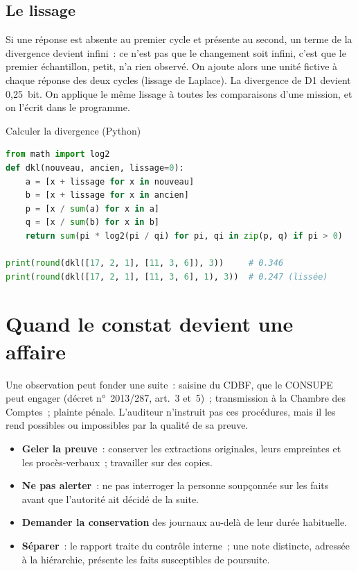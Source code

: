 \subsection{Le lissage}

Si une réponse est absente au premier cycle et présente au second, un terme
de la divergence devient infini~: ce n'est pas que le changement soit
infini, c'est que le premier échantillon, petit, n'a rien observé. On
ajoute alors une unité fictive à chaque réponse des deux cycles (lissage de
Laplace). La divergence de D1 devient 0,25~bit. On applique le même lissage
à toutes les comparaisons d'une mission, et on l'écrit dans le programme.

\begin{boxoutils}{Calculer la divergence (Python)}
\begin{lstlisting}[language=Python]
from math import log2
def dkl(nouveau, ancien, lissage=0):
    a = [x + lissage for x in nouveau]
    b = [x + lissage for x in ancien]
    p = [x / sum(a) for x in a]
    q = [x / sum(b) for x in b]
    return sum(pi * log2(pi / qi) for pi, qi in zip(p, q) if pi > 0)

print(round(dkl([17, 2, 1], [11, 3, 6]), 3))     # 0.346
print(round(dkl([17, 2, 1], [11, 3, 6], 1), 3))  # 0.247 (lissée)
\end{lstlisting}
\end{boxoutils}

\separateur

\section{Quand le constat devient une affaire}
\label{sec:c08-suites}

Une observation peut fonder une suite~: saisine du CDBF, que le CONSUPE peut
engager (décret n°~2013/287, art.~3 et~5)~; transmission à la Chambre des
Comptes~; plainte pénale. L'auditeur n'instruit pas ces procédures, mais il
les rend possibles ou impossibles par la qualité de sa preuve.

\begin{itemize}
    \item \textbf{Geler la preuve}~: conserver les extractions originales,
          leurs empreintes et les procès-verbaux~; travailler sur des copies.
    \item \textbf{Ne pas alerter}~: ne pas interroger la personne soupçonnée
          sur les faits avant que l'autorité ait décidé de la suite.
    \item \textbf{Demander la conservation} des journaux au-delà de leur
          durée habituelle.
    \item \textbf{Séparer}~: le rapport traite du contrôle interne~; une note
          distincte, adressée à la hiérarchie, présente les faits
          susceptibles de poursuite.
\end{itemize}

